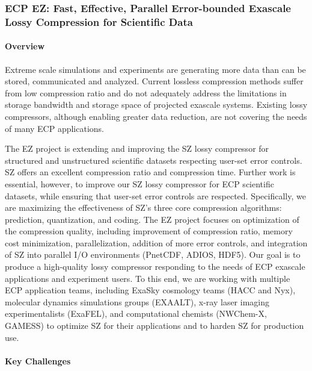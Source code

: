 \subsubsection{ ECP EZ: Fast, Effective, Parallel Error-bounded Exascale Lossy Compression for Scientific Data}

\paragraph{Overview}

Extreme scale simulations and experiments are generating more data than can be stored, communicated and analyzed. Current lossless compression methods suffer from low compression ratio and do not adequately address the limitations in storage bandwidth and storage space of projected exascale systems. Existing lossy compressors, although enabling greater data reduction, are not covering the needs of many ECP applications.

The EZ project is extending and improving the SZ lossy compressor for structured and unstructured scientific datasets respecting user-set error controls. SZ offers an excellent compression ratio and compression time. Further work is essential, however, to improve our SZ lossy compressor for ECP scientific datasets, while ensuring that user-set error controls are respected. Specifically, we are maximizing the effectiveness of SZ’s three core compression algorithms: prediction, quantization, and coding. The EZ project focuses on optimization of the compression quality, including improvement of compression ratio, memory cost minimization, parallelization, addition of more error controls, and integration of SZ into parallel I/O environments (PnetCDF, ADIOS, HDF5). Our goal is to produce a high-quality lossy compressor responding to the needs of ECP exascale applications and experiment users. To this end, we are working with multiple ECP application teams, including ExaSky cosmology teams (HACC and Nyx), molecular dynamics simulations groups (EXAALT), x-ray laser imaging experimentalists (ExaFEL), and computational chemists (NWChem-X, GAMESS) to optimize SZ for their applications and to harden SZ for production use.

\paragraph{Key Challenges}

